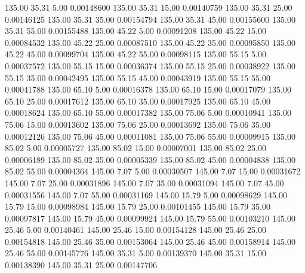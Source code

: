     135.00     35.31      5.00     0.00148600
    135.00     35.31     15.00     0.00140759
    135.00     35.31     25.00     0.00146125
    135.00     35.31     35.00     0.00154794
    135.00     35.31     45.00     0.00155600
    135.00     35.31     55.00     0.00155488
    135.00     45.22      5.00     0.00091208
    135.00     45.22     15.00     0.00084532
    135.00     45.22     25.00     0.00087510
    135.00     45.22     35.00     0.00095850
    135.00     45.22     45.00     0.00099704
    135.00     45.22     55.00     0.00098115
    135.00     55.15      5.00     0.00037572
    135.00     55.15     15.00     0.00036374
    135.00     55.15     25.00     0.00038922
    135.00     55.15     35.00     0.00042495
    135.00     55.15     45.00     0.00043919
    135.00     55.15     55.00     0.00041788
    135.00     65.10      5.00     0.00016378
    135.00     65.10     15.00     0.00017079
    135.00     65.10     25.00     0.00017612
    135.00     65.10     35.00     0.00017925
    135.00     65.10     45.00     0.00018624
    135.00     65.10     55.00     0.00017382
    135.00     75.06      5.00     0.00010941
    135.00     75.06     15.00     0.00013602
    135.00     75.06     25.00     0.00013692
    135.00     75.06     35.00     0.00012126
    135.00     75.06     45.00     0.00011081
    135.00     75.06     55.00     0.00009915
    135.00     85.02      5.00     0.00005727
    135.00     85.02     15.00     0.00007001
    135.00     85.02     25.00     0.00006189
    135.00     85.02     35.00     0.00005339
    135.00     85.02     45.00     0.00004838
    135.00     85.02     55.00     0.00004364
    145.00      7.07      5.00     0.00030507
    145.00      7.07     15.00     0.00031672
    145.00      7.07     25.00     0.00031896
    145.00      7.07     35.00     0.00031094
    145.00      7.07     45.00     0.00031556
    145.00      7.07     55.00     0.00031169
    145.00     15.79      5.00     0.00098629
    145.00     15.79     15.00     0.00098984
    145.00     15.79     25.00     0.00101455
    145.00     15.79     35.00     0.00097817
    145.00     15.79     45.00     0.00099924
    145.00     15.79     55.00     0.00103210
    145.00     25.46      5.00     0.00140461
    145.00     25.46     15.00     0.00154128
    145.00     25.46     25.00     0.00154818
    145.00     25.46     35.00     0.00153064
    145.00     25.46     45.00     0.00158914
    145.00     25.46     55.00     0.00145776
    145.00     35.31      5.00     0.00139370
    145.00     35.31     15.00     0.00138390
    145.00     35.31     25.00     0.00147706
